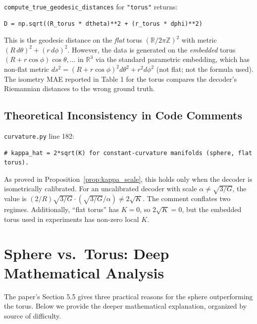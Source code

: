 \documentclass[11pt]{article}
\newcommand{\R}{\mathbb{R}}
\newcommand{\Z}{\mathbb{Z}}
\begin{document}
\begin{bugbox}
\texttt{compute\_true\_geodesic\_distances} for \texttt{"torus"} returns:
\begin{verbatim}
D = np.sqrt((R_torus * dtheta)**2 + (r_torus * dphi)**2)
\end{verbatim}
This is the geodesic distance on the \emph{flat} torus $(\R/2\pi\Z)^2$ with
metric $(R\,d\theta)^2 + (r\,d\phi)^2$. However, the data is generated on the
\emph{embedded} torus $(R+r\cos\phi)\cos\theta, \ldots$ in $\R^3$ via the
standard parametric embedding, which has non-flat metric
$ds^2 = (R+r\cos\phi)^2 d\theta^2 + r^2 d\phi^2$ (not flat; not the formula
used). The isometry MAE reported in Table 1 for the torus compares the decoder's
Riemannian distances to the wrong ground truth.
\end{bugbox}

\subsection{Theoretical Inconsistency in Code Comments}

\begin{bugbox}[B6: Code comment claims $\hat\kappa = 2\sqrt{K}$ for all manifolds]
\texttt{curvature.py} line 182:
\begin{verbatim}
# kappa_hat = 2*sqrt(K) for constant-curvature manifolds (sphere, flat torus).
\end{verbatim}
As proved in Proposition~\ref{prop:kappa_scale}, this holds only when the decoder
is isometrically calibrated. For an uncalibrated decoder with scale $\alpha \ne
\sqrt{3/G}$, the value is $(2/R)\sqrt{3/G}\cdot(\sqrt{3/G}/\alpha) \ne 2\sqrt{K}$.
The comment conflates two regimes. Additionally, ``flat torus'' has $K = 0$, so
$2\sqrt{K} = 0$, but the embedded torus used in experiments has non-zero local $K$.
\end{bugbox}

\section{Sphere vs.\ Torus: Deep Mathematical Analysis}

The paper's Section 5.5 gives three practical reasons for the sphere outperforming
the torus. Below we provide the deeper mathematical explanation, organized by
source of difficulty.
\end{document}
